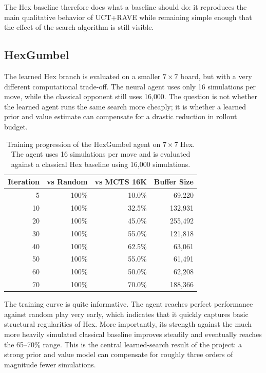 \documentclass[11pt,a4paper]{article}
\begin{document}
The Hex baseline therefore does what a baseline should do: it reproduces the
main qualitative behavior of UCT+RAVE while remaining simple enough that the
effect of the search algorithm is still visible.

\subsection{HexGumbel}

The learned Hex branch is evaluated on a smaller $7\times 7$ board, but with a
very different computational trade-off. The neural agent uses only 16
simulations per move, while the classical opponent still uses 16{,}000. The
question is not whether the learned agent runs the same search more cheaply; it
is whether a learned prior and value estimate can compensate for a drastic
reduction in rollout budget.

\begin{table}[t]
\centering
\begin{tabular}{@{}rrrr@{}}
\toprule
Iteration & vs Random & vs MCTS 16K & Buffer Size \\
\midrule
5  & 100\% & 10.0\% &  69{,}220 \\
10 & 100\% & 32.5\% & 132{,}931 \\
20 & 100\% & 45.0\% & 255{,}492 \\
30 & 100\% & 55.0\% & 121{,}818 \\
40 & 100\% & 62.5\% &  63{,}061 \\
50 & 100\% & 55.0\% &  61{,}491 \\
60 & 100\% & 50.0\% &  62{,}208 \\
70 & 100\% & 70.0\% & 188{,}366 \\
\bottomrule
\end{tabular}
\caption{Training progression of the HexGumbel agent on $7\times 7$ Hex. The
agent uses 16 simulations per move and is evaluated against a classical Hex
baseline using 16{,}000 simulations.}
\label{tab:hexgumbel-results}
\end{table}

The training curve is quite informative. The agent reaches perfect performance
against random play very early, which indicates that it quickly captures basic
structural regularities of Hex. More importantly, its strength against the much
more heavily simulated classical baseline improves steadily and eventually
reaches the 65--70\% range. This is the central learned-search result of the
project: a strong prior and value model can compensate for roughly three orders
of magnitude fewer simulations.
\end{document}
